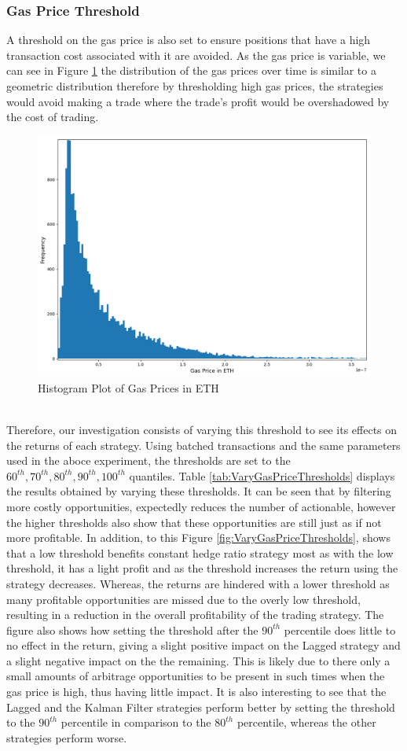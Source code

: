 \subsubsection{Gas Price Threshold}
A threshold on the gas price is also set to ensure positions that have a high transaction cost associated with it are avoided. As the gas price is variable, we can see in Figure \ref{fig:GasPriceHistogram} the distribution of the gas prices over time is similar to a geometric distribution therefore by thresholding high gas prices, the strategies would avoid making a trade where the trade's profit would be overshadowed by the cost of trading.
\begin{figure}[h!]
    \centering
    \includegraphics[width=0.7\linewidth]{evaluation/Images/GasPriceHistogram.png}
    \caption{Histogram Plot of Gas Prices in ETH}
    \label{fig:GasPriceHistogram}
\end{figure}
\\[3mm]
\noindent Therefore, our investigation  consists of varying this threshold to see its effects on the returns of each strategy. Using batched transactions and the same parameters used in the aboce experiment, the thresholds are set to the $60^{th}, 70^{th},80^{th},90^{th},100^{th}$ quantiles. Table \ref{tab:VaryGasPriceThresholds} displays the results obtained by varying these thresholds. It can be seen that by filtering more costly opportunities, expectedly reduces the number of actionable, however the higher thresholds also show that these opportunities are still just as if not more profitable. In addition, to this Figure \ref{fig:VaryGasPriceThresholds}, shows that a low threshold benefits constant hedge ratio strategy most as with the low threshold, it has a light profit and as the threshold increases the return using the strategy decreases. Whereas, the returns are hindered with a lower threshold as many profitable opportunities are missed due to the overly low threshold, resulting in a reduction in the overall profitability of the trading strategy. The figure also shows how setting the threshold after the $90^{th}$ percentile does little to no effect in the return, giving a slight positive impact on the Lagged strategy and a slight negative impact on the the remaining. This is likely due to there only a small amounts of arbitrage opportunities to be present in such times when the gas price is high, thus having little impact. It is also interesting to see that the Lagged and the Kalman Filter strategies perform better by setting the threshold to the $90^{th}$ percentile in comparison to the $80^{th}$ percentile, whereas the other strategies perform worse.
